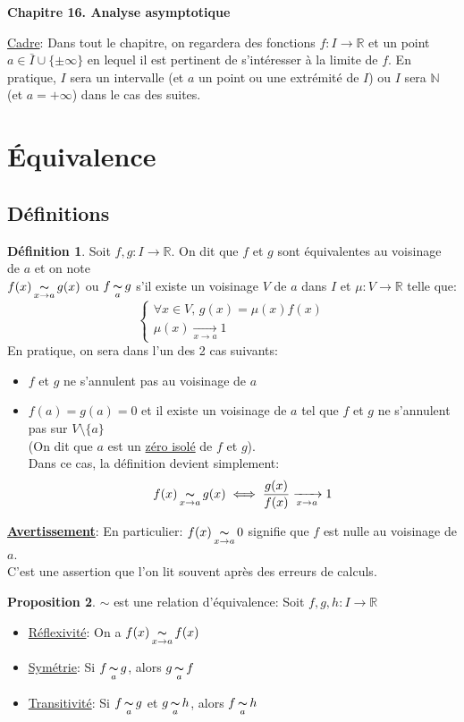 \documentclass[10pt,a4paper]{article}
\theoremstyle{definition}
\newtheorem{proposition}{Proposition}[section]
\newtheorem{definition}[proposition]{Définition}
\DeclareMathOperator*{\eqv}{\thicksim}
\begin{document}
\renewcommand{\labelitemi}{$*$}
\renewcommand{\labelenumi}{(\roman{enumi})}
\begin{center}
{\Large \textbf{Chapitre 16. Analyse asymptotique}}
\end{center}
\uline{Cadre}: Dans tout le chapitre, on regardera des fonctions $f: I \to \mathbb{R}$ et un point $a \in \bar{I} \cup \{  \pm\infty \}$ en lequel il est pertinent de s'intéresser à la limite de $f$. En pratique, $I$ sera un intervalle (et $a$ un point ou une extrémité de $I$) ou $I$ sera $\mathbb{N}$ (et $a = +\infty$) dans le cas des suites.

\section{Équivalence}
\subsection{Définitions}
\begin{definition}
Soit $f,g: I \to \mathbb{R}$. On dit que $f$ et $g$ sont équivalentes au voisinage de $a$ et on note \\
$f(x) \eqv\limits_{x \to a} g(x)$ ou $f \eqv\limits_{a} g$ s'il existe un voisinage $V$ de $a$ dans $I$ et $\mu: V \to \mathbb{R}$ telle que:
\[ \begin{cases}
\forall x \in V ,\, g(x) = \mu(x) f(x) \\
\mu(x) \xrightarrow[x \to a]{} 1
\end{cases} \]
En pratique, on sera dans l'un des 2 cas suivants:
\begin{itemize}
\item $f$ et $g$ ne s'annulent pas au voisinage de $a$
\item $f(a) = g(a) = 0$ et il existe un voisinage de $a$ tel que $f$ et $g$ ne s'annulent pas sur $V \setminus \{ a \}$ \\
(On dit que $a$ est un  \uline{zéro isolé} de $f$ et $g$). \\
Dans ce cas, la définition devient simplement:
\[ f(x) \eqv\limits_{x \to a} g(x) \iff \frac{g(x)}{f(x)} \xrightarrow[x \to a]{} 1 \]
\end{itemize}
\end{definition}
\medskip
\noindent \uline{\textbf{Avertissement}}: En particulier: $f(x) \eqv\limits_{x \to a} 0$ signifie que $f$ est nulle au voisinage de $a$. \\
C'est une assertion que l'on lit souvent après des erreurs de calculs.
\begin{proposition}
$\sim$ est une relation d'équivalence: Soit $f,g,h : I \to \mathbb{R}$
\begin{itemize}
\item \uline{Réflexivité}: On a $f(x) \eqv\limits_{x \to a} f(x)$
\item \uline{Symétrie}: Si $f \eqv\limits_{a} g$, alors $g \eqv\limits_{a} f$
\item \uline{Transitivité}: Si $f \eqv\limits_{a} g$ et $g \eqv\limits_{a} h$, alors $f \eqv\limits_{a} h$
\end{itemize}
\end{proposition}
\end{document}
